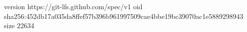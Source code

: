 version https://git-lfs.github.com/spec/v1
oid sha256:452db17a035da8ffef57b396b961997509cae4bbe19bc39070ac1e5889298943
size 22634
